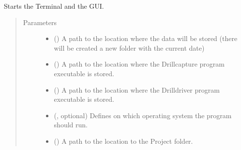 \documentclass[letterpaper,10pt,english]{sphinxmanual}
\begin{document}
\begin{fulllineitems}
\begin{fulllineitems}
\sphinxAtStartPar
Starts the Terminal and the GUI.
\begin{quote}\begin{description}
\item[{Parameters}] \leavevmode\begin{itemize}
\item {} 
\sphinxAtStartPar
{} (\sphinxstyleliteralemphasis{\sphinxupquote{, }}) \textendash{} A path to the location where the data will be stored (there will be created a new folder with the current date)

\item {} 
\sphinxAtStartPar
{} (\sphinxstyleliteralemphasis{\sphinxupquote{, }}) \textendash{} A path to the location where the Drillcapture program executable is stored.

\item {} 
\sphinxAtStartPar
{} (\sphinxstyleliteralemphasis{\sphinxupquote{, }}) \textendash{} A path to the location where the Drilldriver program executable is stored.

\item {} 
\sphinxAtStartPar
{} ({\hyperref[\detokenize{anoog.automation:anoog.automation.py_exe_interface.op}]{}}, optional) \textendash{} Defines on which operating system the program should run.

\item {} 
\sphinxAtStartPar
{} (\sphinxstyleliteralemphasis{\sphinxupquote{, }}) \textendash{} A path to the location to the Project folder.

\end{itemize}

\end{description}\end{quote}

\end{fulllineitems}


\end{fulllineitems}
\end{document}
